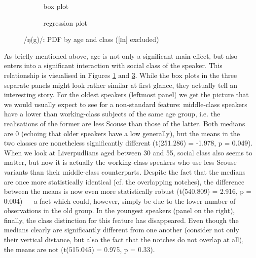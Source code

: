 \begin{figure}[h]
	\centering
	\begin{subfigure}{.49\textwidth}
		\centering
			\resizebox{\linewidth}{!}{} 
		\caption{box plot}
		\label{fig.box.ng.ageclass}
	\end{subfigure}
	\begin{subfigure}{.49\textwidth}
		\centering
			\resizebox{\linewidth}{!}{}
		\caption{regression plot}
		\label{fig.scatter.ng.ageclass}
	\end{subfigure}
	\caption{/ŋ(g)/: PDF by age and class ([ɪn] excluded)}
\end{figure}

As briefly mentioned above, age is not only a significant main effect, but also enters into a significant interaction with social class of the speaker.
This relationship is visualised in Figures \ref{fig.box.ng.ageclass} and \ref{fig.scatter.ng.ageclass}.
While the box plots in the three separate panels might look rather similar at first glance, they actually tell an interesting story.
For the oldest speakers (leftmost panel) we get the picture that we would usually expect to see for a non-standard feature: middle-class speakers have a lower  than working-class subjects of the same age group, i.e. the realisations of the former are less Scouse than those of the latter.
Both medians are 0 (echoing that older speakers have a low  generally), but the means in the two classes are nonetheless significantly different (t(251.286) = -1.978, p = 0.049).
When we look at Liverpudlians aged between 30 and 55, social class also seems to matter, but now it is actually the working-class speakers who use less Scouse variants than their middle-class counterparts.
Despite the fact that the medians are once more statistically identical (cf. the overlapping notches), the difference between the means is now even more statistically robust (t(540.809) = 2.916, p = 0.004) --- a fact which could, however, simply be due to the lower number of observations in the old group.
In the youngest speakers (panel on the right), finally, the class distinction for this feature has disappeared.
Even though the medians clearly are significantly different from one another (consider not only their vertical distance, but also the fact that the notches do not overlap at all), the means are not (t(515.045) = 0.975, p = 0.33).

